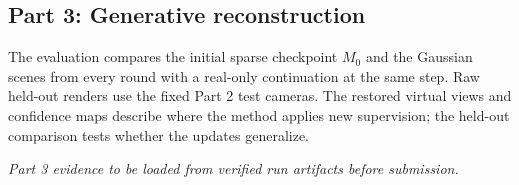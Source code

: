 \subsection{Part 3: Generative reconstruction}
\label{sec:part3}
\ifpartthreeevidence
\partthreeresults
\else
The evaluation compares the initial sparse checkpoint $M_0$ and the Gaussian scenes from every round with a real-only continuation at the same step. Raw held-out renders use the fixed Part 2 test cameras. The restored virtual views and confidence maps describe where the method applies new supervision; the held-out comparison tests whether the updates generalize.

\emph{Part 3 evidence to be loaded from verified run artifacts before submission.}
\fi
